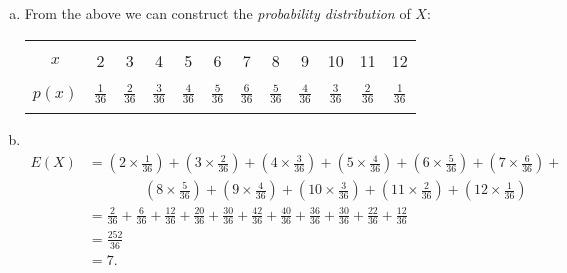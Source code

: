 \documentclass[12pt]{article}
\begin{document}
{\begin{minipage}[t]{0.98\textwidth}
\begin{enumerate}[a)]
\item From the above we can construct the \emph{probability distribution} of $X$:
\begin{center}
\begin{tabular}{|c|ccccccccccc|}
\hline
&&&&&&&&&&&\\[-0.4cm]
$x$ & 2 & 3 & 4 & 5 & 6 & 7 & 8 & 9 & 10 & 11 & 12\\
\hline
&&&&&&&&&&&\\[-0.2cm]
$p(x)$ & ${\displaystyle\frac{1}{36}}$ & ${\displaystyle\frac{2}{36}}$ & ${\displaystyle\frac{3}{36}}$ & ${\displaystyle\frac{4}{36}}$ & ${\displaystyle\frac{5}{36}}$ & ${\displaystyle\frac{6}{36}}$ & ${\displaystyle\frac{5}{36}}$ & ${\displaystyle\frac{4}{36}}$ & ${\displaystyle\frac{3}{36}}$ & ${\displaystyle\frac{2}{36}}$ & ${\displaystyle\frac{1}{36}}$ \\[0.3cm]
\hline
\multicolumn{12}{c}{}
\end{tabular}
\end{center}
\item \quad\\[-1.45cm]
\begin{align*}
E(X) &= \left(2\times\frac{1}{36}\right) + \left(3\times\frac{2}{36}\right) + \left(4\times\frac{3}{36}\right) + \left(5\times\frac{4}{36}\right) + \left(6\times\frac{5}{36}\right) + \left(7\times\frac{6}{36}\right) + \\
&\qquad\qquad \left(8\times\frac{5}{36}\right) + \left(9\times\frac{4}{36}\right) + \left(10\times\frac{3}{36}\right) + \left(11\times\frac{2}{36}\right) + \left(12\times\frac{1}{36}\right) \\[0.2cm]
&= \frac{2}{36} + \frac{6}{36} + \frac{12}{36} + \frac{20}{36} + \frac{30}{36} + \frac{42}{36} + \frac{40}{36} + \frac{36}{36} + \frac{30}{36} + \frac{22}{36} + \frac{12}{36} \\[0.2cm]
&= \frac{252}{36} \\
&= 7.
\end{align*}
\end{enumerate}
\end{minipage}}\vspace{0.03\textwidth}
\end{document}
